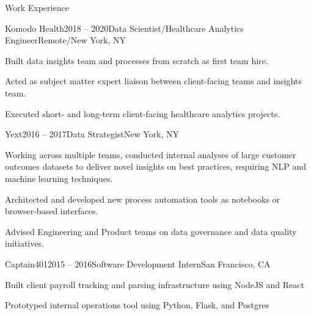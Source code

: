 \documentclass{resume} %
\begin{document}




\begin{rSection}{Work Experience}
\begin{rSubsection}{Komodo Health}{2018 -- 2020}{Data Scientist/Healthcare Analytics Engineer}{Remote/New York, NY}
\item Built data insights team and processes from scratch as first team hire.
\item Acted as subject matter expert liaison between client-facing teams and insights team.
\item Executed short- and long-term client-facing healthcare analytics projects.

\end{rSubsection}
\begin{rSubsection}{Yext}{2016 -- 2017}{Data Strategist}{New York, NY}
\item Working across multiple teams, conducted internal analyses of large customer outcomes datasets to deliver novel insights on best practices, requiring NLP and machine learning techniques.
\item Architected and developed new process automation tools as notebooks or browser-based interfaces.
\item Advised Engineering and Product teams on data governance and data quality initiatives.

\end{rSubsection}

\begin{rSubsection}{Captain401}{2015 -- 2016}{Software Development Intern}{San Francisco, CA}
\item Built client payroll tracking and parsing infrastructure using NodeJS and React
\item Prototyped internal operations tool using Python, Flask, and Postgres

\end{rSubsection}



\end{rSection}
\end{document}
